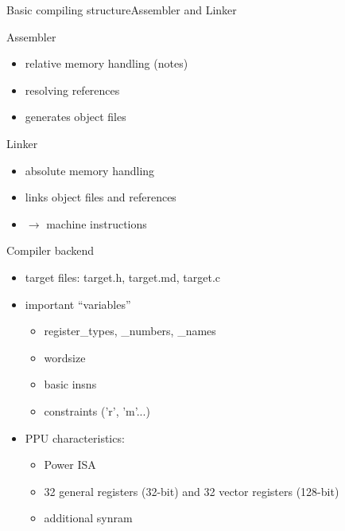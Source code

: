 \documentclass[10pt]{beamer}
\begin{document}
\begin{frame}{Basic compiling structure}{Assembler and Linker}
    \begin{block}{Assembler}
       	\begin{itemize}
		\item relative memory handling (notes)
		\item resolving references
		\item generates object files
       	\end{itemize}
    \end{block}
    \begin{block}{Linker}
	\begin{itemize}
       		\item absolute memory handling
       		\item links object files and references
       		\item $\rightarrow$ machine instructions
       	\end{itemize}
    \end{block}
\end{frame}

\begin{frame}[fragile]{Compiler backend}
	\begin{itemize}
		\item target files: target.h, target.md, target.c
		\item important ``variables''
			\begin{itemize}
				\item register\_types, \_numbers, \_names
				\item wordsize
				\item basic insns
				\item constraints ('r', 'm'...)
			\end{itemize}
		\item PPU characteristics:
			\begin{itemize}
				\item Power ISA
				\item 32 general registers (32-bit) and 32 vector registers (128-bit)
				\item additional synram
			\end{itemize}
 	\end{itemize}
\end{frame}
\end{document}
